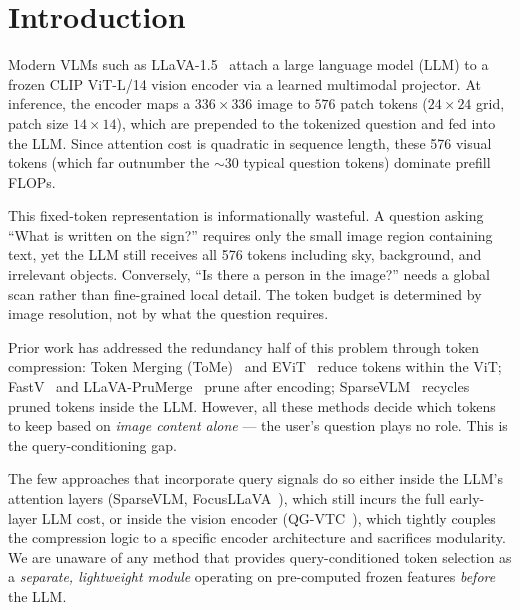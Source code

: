 \documentclass{article}
\begin{document}
\section{Introduction}
\label{sec:intro}

Modern VLMs such as LLaVA-1.5~\cite{liu2024llava} attach a large language model (LLM)
to a frozen CLIP ViT-L/14 vision encoder via a learned multimodal projector.
At inference, the encoder maps a $336\times336$ image to $576$ patch tokens
($24\times24$ grid, patch size $14\times14$), which are prepended to the tokenized
question and fed into the LLM.
Since attention cost is quadratic in sequence length, these 576 visual tokens
(which far outnumber the $\sim$30 typical question tokens) dominate prefill FLOPs.

This fixed-token representation is informationally wasteful.
A question asking ``What is written on the sign?'' requires only the small image region
containing text, yet the LLM still receives all 576 tokens including sky, background,
and irrelevant objects. Conversely, ``Is there a person in the image?'' needs a global
scan rather than fine-grained local detail. The token budget is determined by image
resolution, not by what the question requires.

Prior work has addressed the redundancy half of this problem through token compression:
Token Merging (ToMe)~\cite{bolya2022token} and EViT~\cite{liang2022evit} reduce tokens
within the ViT; FastV~\cite{chen2024fastv} and LLaVA-PruMerge~\cite{shang2024llava}
prune after encoding; SparseVLM~\cite{zhang2025sparsevlm} recycles pruned tokens inside
the LLM. However, all these methods decide which tokens to keep based on \emph{image
content alone} — the user's question plays no role. This is the query-conditioning gap.

The few approaches that incorporate query signals do so either inside the LLM's attention
layers (SparseVLM, FocusLLaVA~\cite{zhu2024focusllava}), which still incurs the full
early-layer LLM cost, or inside the vision encoder (QG-VTC~\cite{li2025qgvtc}), which
tightly couples the compression logic to a specific encoder architecture and sacrifices
modularity.
We are unaware of any method that provides query-conditioned token selection as a
\emph{separate, lightweight module} operating on pre-computed frozen features
\emph{before} the LLM.
\end{document}
